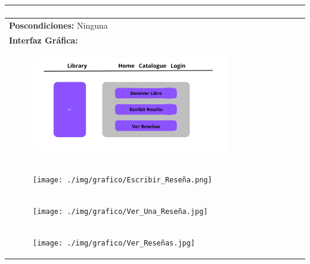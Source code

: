 \documentclass{report}
\begin{document}
\begin{center}
\begin{longtable}{|p{\linewidth}|}
\begin{enumerate}
                \end{enumerate}\\
                \hline
                \textbf{Poscondiciones:} Ninguna\\
                \hline
                \textbf{Interfaz Gráfica:}\\
                \begin{figure}[H]
                    \centering
                    \includegraphics[width=0.8\textwidth]{./img/grafico/Ver_Libro.png}
                \end{figure}\\
                \hline
                \begin{figure}[H]
                    \centering
                    \texttt{[image: ./img/grafico/Escribir\_Reseña.png]}
                \end{figure}\\
                \hline
                \begin{figure}[H]
                    \centering
                    \texttt{[image: ./img/grafico/Ver\_Una\_Reseña.jpg]}
                \end{figure}\\
                \hline
                \begin{figure}[H]
                    \centering
                    \texttt{[image: ./img/grafico/Ver\_Reseñas.jpg]}
                \end{figure}\\
                \hline
            \end{longtable}
        \end{center}
        \clearpage
\end{document}
